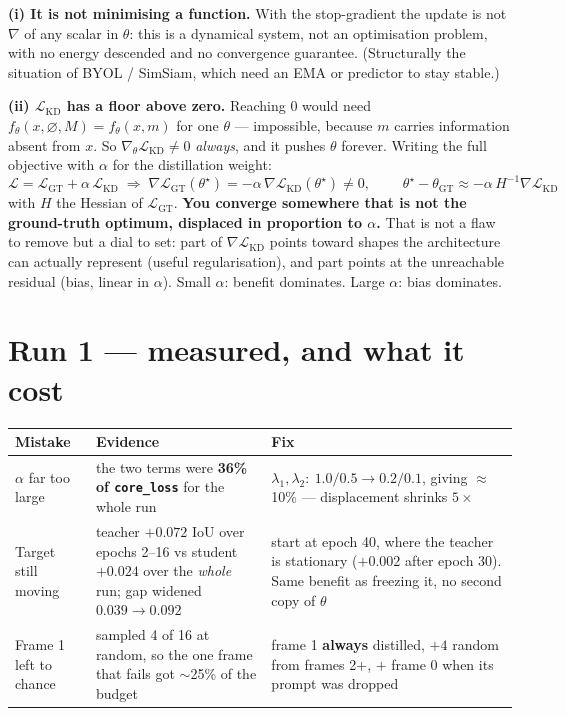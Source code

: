 \documentclass[9pt,a4paper]{extarticle}
\begin{document}
\textbf{(i) It is not minimising a function.} With the stop-gradient the update is not $\nabla$ of any scalar in
$\theta$: this is a dynamical system, not an optimisation problem, with no energy descended and no convergence
guarantee. (Structurally the situation of BYOL / SimSiam, which need an EMA or predictor to stay stable.)

\textbf{(ii) $\mathcal{L}_{\text{KD}}$ has a floor above zero.} Reaching $0$ would need
$f_\theta(x,\varnothing,M) = f_\theta(x,m)$ for one $\theta$ --- impossible, because $m$ carries information absent
from $x$. So $\nabla_\theta\mathcal{L}_{\text{KD}} \neq 0$ \emph{always}, and it pushes $\theta$ forever. Writing
the full objective with $\alpha$ for the distillation weight:
\[
\mathcal{L}=\mathcal{L}_{\text{GT}}+\alpha\,\mathcal{L}_{\text{KD}}
\;\Longrightarrow\;
\nabla\mathcal{L}_{\text{GT}}(\theta^\star)=-\alpha\,\nabla\mathcal{L}_{\text{KD}}(\theta^\star)\neq 0,
\qquad
\boxed{\;\theta^\star-\theta_{\text{GT}} \approx -\alpha\,H^{-1}\nabla\mathcal{L}_{\text{KD}}\;}
\]
with $H$ the Hessian of $\mathcal{L}_{\text{GT}}$. \textbf{You converge somewhere that is not the ground-truth
optimum, displaced in proportion to $\alpha$.} That is not a flaw to remove but a dial to set: part of
$\nabla\mathcal{L}_{\text{KD}}$ points toward shapes the architecture can actually represent (useful
regularisation), and part points at the unreachable residual (bias, linear in $\alpha$). Small $\alpha$: benefit
dominates. Large $\alpha$: bias dominates.

\section{Run 1 --- measured, and what it cost}
\begin{center}
\begin{tabular}{>{\raggedright\arraybackslash}p{5.0cm}>{\raggedright\arraybackslash}p{5.3cm}>{\raggedright\arraybackslash}p{6.0cm}}
\toprule
\textbf{Mistake} & \textbf{Evidence} & \textbf{Fix} \\
\midrule
$\alpha$ far too large & the two terms were \textcolor{bad}{\textbf{36\% of \texttt{core\_loss}}} for the whole run
& $\lambda_1,\lambda_2:\ 1.0/0.5 \to 0.2/0.1$, giving $\approx$10\% --- displacement shrinks $5\times$ \\
Target still moving & teacher $+0.072$ IoU over epochs 2--16 vs student $+0.024$ over the \emph{whole} run; gap
\textcolor{bad}{widened} $0.039\to0.092$ & start at epoch 40, where the teacher is stationary
($+0.002$ after epoch 30). Same benefit as freezing it, no second copy of $\theta$ \\
Frame 1 left to chance & sampled 4 of 16 at random, so the one frame that fails got $\sim$25\% of the budget
& frame 1 \textbf{always} distilled, $+4$ random from frames 2+, $+$ frame 0 when its prompt was dropped \\
\bottomrule
\end{tabular}
\end{center}
\end{document}
